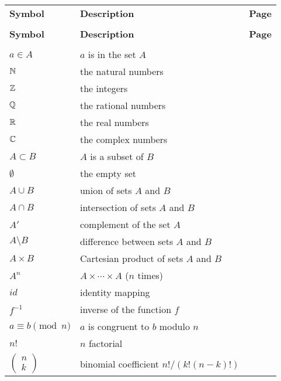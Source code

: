 \begin{center}
\begin{longtable}{llr}
%
\multicolumn{1}{l}{\bf Symbol} & \multicolumn{1}{l}{\bf Description} & \multicolumn{1}{r}{\bf Page} \\
&&\\
\endfirsthead
%
\multicolumn{1}{l}{\bf Symbol} & \multicolumn{1}{l}{\bf Description} & \multicolumn{1}{r}{\bf Page} \\
&&\\
\endhead
%
$a \in A$ & $a$ is in the set $A$ & \pageref{setmembership} \\
%
${\Bbb N}$ & the natural numbers & \pageref{naturalnum} \\
%
${\Bbb Z}$ & the integers & \pageref{integers} \\
%
${\Bbb Q}$ & the rational numbers & \pageref{rationals} \\
%
${\Bbb R}$ & the real numbers & \pageref{reals} \\
%
${\Bbb C}$ & the complex numbers & \pageref{complexnum} \\
%
$A \subset B$ & $A$ is a subset of $B$ & \pageref{setcontain} \\
%
$\emptyset$ & the empty set & \pageref{theemptyset} \\
%
$A \cup B$ & union of sets $A$ and $B$ & \pageref{union} \\
%
$A \cap B$ & intersection of sets $A$ and $B$ & \pageref{intersection} \\
%
$A'$ & complement of the  set $A$ & \pageref{setcomplement} \\
%
$A \setminus B$ & difference between sets $A$ and $B$ & \pageref{setdifference} \\
%
$A \times B$ & Cartesian product of sets $A$ and $B$ & \pageref{cartesian} \\
%
$A^n$ & $A \times \cdots \times A$ ($n$ times) & \pageref{ncartesian} \\
%
$id$ & identity mapping & \pageref{noteidentity} \\
%
$f^{-1}$ & inverse of the function $f$	& \pageref{inversefunc} \\
%
$a \equiv b \pmod{n}$ & $a$ is congruent to $b$ modulo $n$ & \pageref{amodb} \\
%
$n!$ & $n$ factorial & \pageref{factorial} \\
%
$\left(\begin{array}{c}n \\ k \end{array} \right)$ & binomial coefficient $n!/(k! (n-k)!)$ & \pageref{binomial} \\

\end{longtable}
\end{center}
